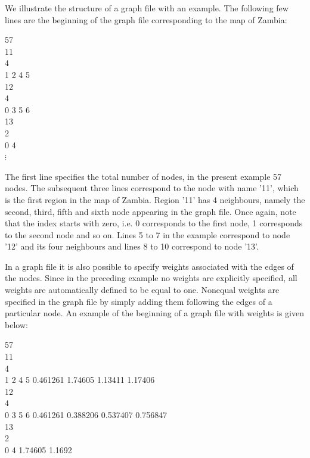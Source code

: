 \documentclass{article}
\begin{document}
We illustrate the structure of a graph file with an example. The
following few lines are the beginning
of the graph file corresponding to the map of Zambia: \\

\footnotesize

 57\\
 11\\
 4\\
 1 2 4 5\\
 12\\
 4\\
 0 3 5 6\\
 13\\
 2\\
 0 4\\

\hspace{1cm} $\vdots$

\normalsize

\vspace{0.5cm}

The first line specifies the total number of nodes, in the present
example 57 nodes. The subsequent three lines correspond to the
node with name '11', which is the first region in the map of
Zambia. Region '11' has 4 neighbours, namely the second, third,
fifth and sixth node appearing in the graph file. Once again, note
that the index starts with zero, i.e. 0 corresponds to the first
node, 1 corresponds to the second node and so on. Lines 5 to 7 in
the example correspond to node '12' and its four neighbours and
lines 8 to 10 correspond to node '13'.

In a graph file it is also possible to specify weights associated
with the edges of the nodes. Since in the preceding example no
weights are explicitly specified, all weights are automatically
defined to be equal to one. Nonequal weights are specified in the
graph file by simply adding them following the edges of a
particular node.
An example of the beginning of a graph file with weights is given below: \\

\footnotesize

 57\\
 11\\
 4\\
 1 2 4 5 0.461261 1.74605 1.13411 1.17406\\
 12\\
 4\\
 0 3 5 6 0.461261 0.388206 0.537407 0.756847\\
 13\\
 2\\
 0 4 1.74605 1.1692\\
\end{document}
